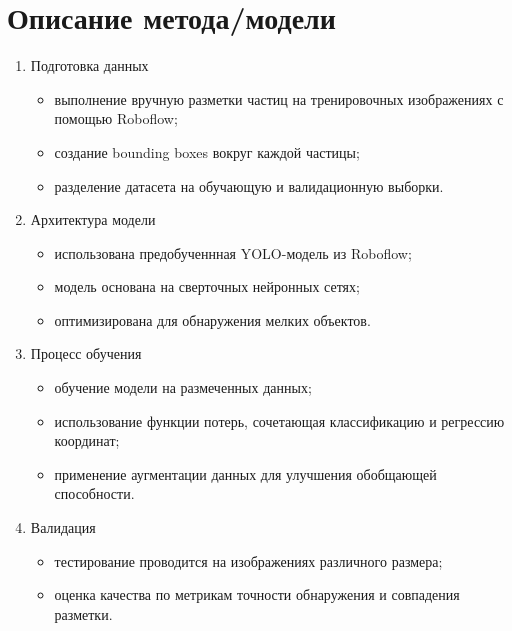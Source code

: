 \documentclass[12pt, a4paper]{report}
\begin{document}
	\section*{Описание метода/модели}
	\large
	\begin{enumerate}
		\item Подготовка данных
		\begin{itemize}
			\item выполнение вручную разметки частиц на тренировочных изображениях с помощью Roboflow;
			\item создание bounding boxes вокруг каждой частицы;
			\item разделение датасета на обучающую и валидационную выборки.
		\end{itemize}
		\item Архитектура модели
		\begin{itemize}
			\item использована предобученнная YOLO-модель из Roboflow;
			\item модель основана на сверточных нейронных сетях;
			\item оптимизирована для обнаружения мелких объектов.
		\end{itemize}
		\item Процесс обучения
		\begin{itemize}
			\item обучение модели на размеченных данных;
			\item использование функции потерь, сочетающая классификацию и регрессию координат;
			\item применение аугментации данных для улучшения обобщающей способности.
		\end{itemize}
		\item Валидация
		\begin{itemize}
			\item тестирование проводится на изображениях различного размера;
			\item оценка качества по метрикам точности обнаружения и совпадения разметки.
		\end{itemize}
	\end{enumerate}

	\newpage
\end{document}
